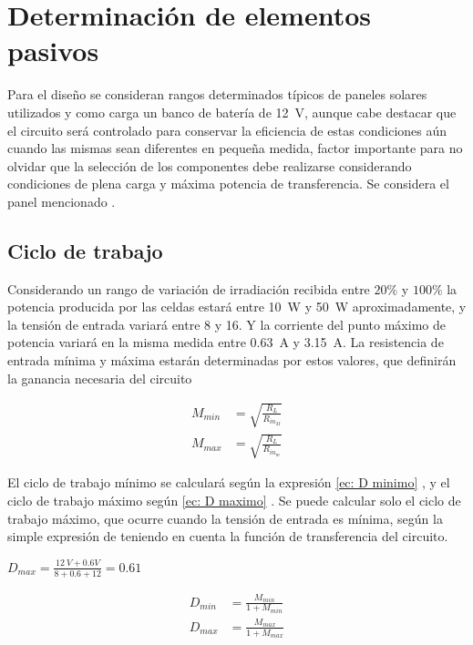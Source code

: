     \section{Determinación de elementos pasivos}
    
    Para el diseño se consideran rangos determinados típicos de paneles solares utilizados y como carga un banco de batería de 12~V, aunque cabe destacar que el circuito será controlado para conservar la eficiencia de estas condiciones aún cuando las mismas sean diferentes en pequeña medida, factor importante para no olvidar que la selección de los componentes debe realizarse considerando condiciones de plena carga y máxima potencia de transferencia. Se considera el panel mencionado \cite{PV_datasheet}. 
        \subsection{Ciclo de trabajo}
        
         Considerando un rango de variación de irradiación recibida entre $20\%$ y $100\%$  la potencia producida por las celdas estará entre 10~W y 50~W aproximadamente, y la tensión de entrada variará entre 8 y 16. Y la corriente del punto máximo de potencia variará en la misma medida entre 0.63~A y 3.15~A. La resistencia de entrada mínima y máxima estarán determinadas por estos valores, que definirán la ganancia necesaria del circuito \cite{atia2009photovoltaic}
 
            \begin{align}
                M_{min} &= \sqrt{\frac{R_L}{R_{in_{M}}}} \\
                M_{max} &= \sqrt{\frac{R_L}{R_{in_{m}}}}
            \end{align}
       
        El ciclo de trabajo mínimo se calculará según la expresión \ref{ec: D minimo} , y el ciclo de trabajo máximo según \ref{ec: D maximo} . Se puede calcular solo el ciclo de trabajo máximo, que ocurre cuando la tensión de entrada es mínima, según la simple expresión de \cite{falin2008designing} teniendo en cuenta la función de transferencia del circuito. 
        
        $D_{max} = \frac{12~V +0.6V}{8 +0.6 + 12} = 0.61$
           
            \begin{align}
                D_{min} &= \frac{M_{min}}{ 1 + M_{min}} \label{ec: D minimo} \\
                D_{max} &= \frac{M_{max}}{ 1 + M_{max}} \label{ec: D maximo}
            \end{align}
      
